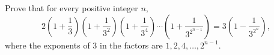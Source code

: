 Prove that for every positive integer $n$,
\[
2\left(1+\dfrac{1}{3}\right)\left(1+\dfrac{1}{3^2}\right)\left(1+\dfrac{1}{3^4}\right)\cdots\left(1+\dfrac{1}{3^{2^{n-1}}}\right)=3\left(1-\dfrac{1}{3^{2^n}}\right),
\]
where the exponents of $3$ in the factors are $1,2,4,\dots,2^{n-1}$.
